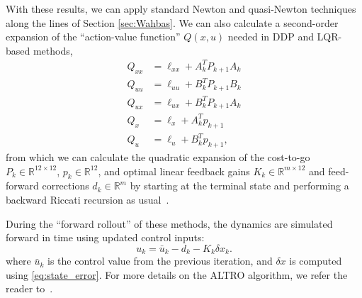 \documentclass[letterpaper, 10 pt, conference]{ieeeconf}  %
\newcommand{\R}{\mathbb{R}}
\begin{document}
	With these results, we can apply standard Newton and quasi-Newton techniques along the lines of Section \ref{sec:Wahbas}. We can also calculate a second-order expansion of the ``action-value function'' $Q(x,u)$ needed in DDP and LQR-based methods,
    \begin{align}
        Q_{xx} &= \ell_{xx} + A_{k}^T P_{k+1} A_{k} \label{Qxx_exp}\\
        Q_{uu} &= \ell_{uu} + B_{k}^T P_{k+1} B_{k} \label{Quu_exp}\\
        Q_{ux} &= \ell_{ux} + B_{k}^T P_{k+1} A_{k} \label{Qux_exp}\\
        Q_x &= \ell_x  + A_{k}^T p_{k+1} \label{Qx_exp}\\
        Q_u &= \ell_u + B_{k}^T p_{k+1} \label{Qu_exp},
    \end{align}
    from which we can calculate the quadratic expansion of the cost-to-go 
    $P_k \in \R^{12 \times 12}$, $p_k \in \R^{12}$, and optimal linear feedback gains 
    $K_k \in \R^{m \times 12}$ and feed-forward corrections $d_k \in \R^m$ by starting at the terminal state and
    performing a backward Riccati recursion as usual~\cite{li2004iterative,howell2019altro}.
    
    During the ``forward rollout'' of these methods, the dynamics are simulated forward in time using updated control inputs: 
    \begin{equation} \label{eq:mlqr_control}
        u_k = \bar{u}_k - d_k - K_k \delta x_k.
    \end{equation}
    where $\bar{u}_k$ is the control value from the previous iteration, and $\delta x$ is
    computed using \eqref{eq:state_error}.%
    For more details on the ALTRO algorithm, we refer the reader to~\cite{howell2019altro}.
\end{document}
